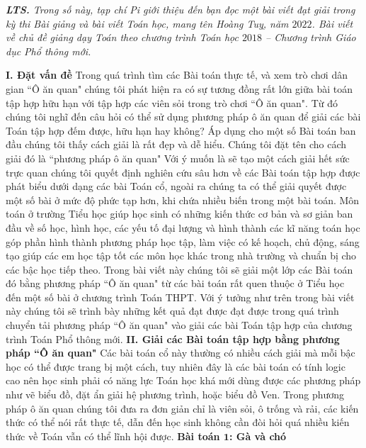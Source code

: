 	\textit{\textbf{LTS.} Trong số này, tạp chí Pi giới thiệu đến bạn đọc một bài viết đạt giải trong kỳ thi Bài giảng và bài viết Toán học, mang tên Hoàng Tuỵ, năm $2022$. Bài viết về chủ đề giảng dạy Toán theo chương trình Toán học $2018$ -- Chương trình Giáo dục Phổ thông mới.}
\begin{multicols}{2}
	\textbf{I.	Đặt vấn đề}
	\vskip 0.1cm
	Trong quá trình tìm các Bài toán thực tế, và xem trò chơi dân gian ``Ô ăn quan" chúng tôi phát hiện ra có sự tương đồng rất lớn giữa bài toán tập hợp hữu hạn với tập hợp các viên sỏi trong trò chơi ``Ô ăn quan". Từ đó chúng tôi nghĩ đến câu hỏi có thể sử dụng phương pháp ô ăn quan để giải các bài Toán tập hợp đếm được, hữu hạn hay không? Áp dụng cho một số Bài toán ban đầu chúng tôi thấy cách giải là rất đẹp và dễ hiểu. Chúng tôi đặt tên cho cách giải đó là ``phương pháp ô ăn quan"
	\vskip 0.1cm
	Với ý muốn là sẽ tạo một cách giải hết sức trực quan chúng tôi quyết định nghiên cứu sâu hơn về các Bài toán tập hợp được phát biểu dưới dạng các bài Toán cổ, ngoài ra chúng ta có thể giải quyết được một số bài ở mức độ phức tạp hơn, khi chứa nhiều biến trong một bài toán.
	\vskip 0.1cm
	Môn toán ở trường Tiểu học giúp học sinh có những kiến thức cơ bản và sơ giản ban đầu về số học, hình học, các yếu tố đại lượng và hình thành các kĩ năng toán học góp phần hình thành phương pháp học tập, làm việc có kế hoạch, chủ động, sáng tạo giúp các em học tập tốt các môn học khác trong nhà trường và chuẩn bị cho các bậc học tiếp theo. Trong bài viết này chúng tôi sẽ giải một lớp các Bài toán đó bằng phương pháp ``Ô ăn quan" từ các bài toán rất quen thuộc ở Tiểu học đến một số bài ở chương trình Toán THPT.
	\vskip 0.1cm
	Với ý tưởng như trên trong bài viết này chúng tôi sẽ trình bày những kết quả đạt được đạt được trong quá trình chuyển tải phương pháp ``Ô ăn quan" vào giải các bài Toán tập hợp của chương trình Toán Phổ thông mới.
	\vskip 0.1cm
	\textbf{II.	Giải các Bài toán tập hợp bằng phương pháp ``Ô ăn quan"}
	\vskip 0.1cm
	Các bài toán cổ này thường có nhiều cách giải mà mỗi bậc học có thể được trang bị một cách, tuy nhiên đây là các bài toán có tính logic cao nên học sinh phải có năng lực Toán học khá mới dùng được các phương pháp như vẽ biểu đồ, đặt ẩn giải hệ phương trình, hoặc biểu đồ Ven. Trong phương pháp ô ăn quan chúng tôi đưa ra đơn giản chỉ là viên sỏi, ô trống và rải, các kiến thức có thể nói rất thực tế, dẫn đến học sinh không cần đòi hỏi quá nhiều kiến thức về Toán vẫn có thể lĩnh hội được.
	\vskip 0.1cm
	\textbf{Bài toán $\pmb{1}$: Gà và chó}
	\begin{center}

\end{center}
\end{multicols}
